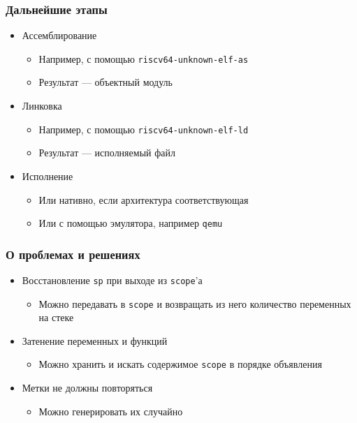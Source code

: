 \documentclass{beamer}
\begin{document}
	\begin{frame}
		\frametitle{Дальнейшие этапы}
		\begin{itemize}
			\item Ассемблирование
			\begin{itemize}
				\item Например, с помощью \lstinline|riscv64-unknown-elf-as|
				\item Результат — объектный модуль
			\end{itemize}
			\item Линковка
				\begin{itemize}
					\item Например, с помощью \lstinline|riscv64-unknown-elf-ld|
					\item Результат — исполняемый файл
				\end{itemize}
			\item Исполнение
			\begin{itemize}
				\item Или нативно, если архитектура соответствующая
				\item Или с помощью эмулятора, например \lstinline|qemu|
			\end{itemize}
		\end{itemize}
	\end{frame}

	\begin{frame}
		\frametitle{О проблемах и решениях}
		\begin{itemize}
			\item Восстановление \lstinline|sp| при выходе из \lstinline|scope|'а
			\begin{itemize}
				\item Можно передавать в \lstinline|scope| и возвращать из него количество переменных на стеке
			\end{itemize}
			\item Затенение переменных и функций
			\begin{itemize}		
				\item Можно хранить и искать содержимое \lstinline|scope| в порядке объявления
			\end{itemize}
			\item Метки не должны повторяться
			\begin{itemize}
				\item Можно генерировать их случайно
			\end{itemize}
		\end{itemize}
	\end{frame}
\end{document}
